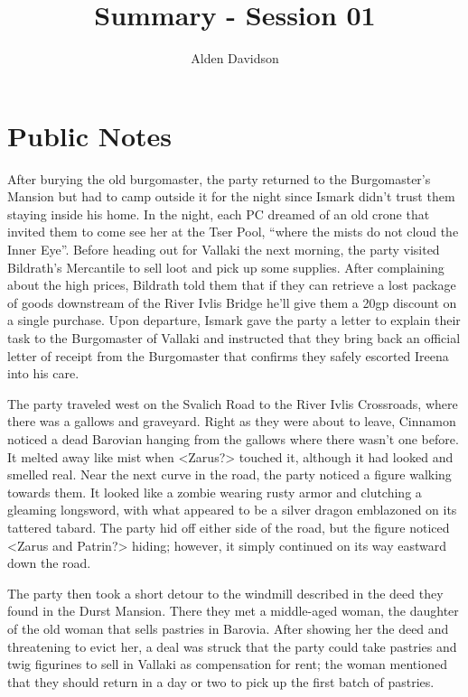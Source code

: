 \documentclass[a4paper,11pt]{article}
\title{Summary - Session 01}
\author{Alden Davidson}
\begin{document}
\maketitle


\section{Public Notes}
After burying the old burgomaster, the party returned to the Burgomaster's Mansion but had to camp outside it for
the night since Ismark didn't trust them staying inside his home. In the night, each PC dreamed of an old crone 
that invited them to come see her at the Tser Pool, ``where the mists do not cloud the Inner Eye''. Before 
heading out for Vallaki the next morning, the party visited Bildrath's Mercantile to sell loot and pick up some 
supplies. After complaining about the high prices, Bildrath told them that if they can retrieve a lost package of 
goods downstream of the River Ivlis Bridge he'll give them a 20gp discount on a single purchase. Upon departure, 
Ismark gave the party a letter to explain their task to the Burgomaster of Vallaki and instructed that they bring 
back an official letter of receipt from the Burgomaster that confirms they safely escorted Ireena into his care.

The party traveled west on the Svalich Road to the River Ivlis Crossroads, where there was a gallows and 
graveyard. Right as they were about to leave, Cinnamon noticed a dead Barovian hanging from the gallows where 
there wasn't one before. It melted away like mist when <Zarus?> touched it, although it had looked and smelled 
real. Near the next curve in the road, the party noticed a figure walking towards them. It looked like a zombie 
wearing rusty armor and clutching a gleaming longsword, with what appeared to be a silver dragon emblazoned on 
its tattered tabard. The party hid off either side of the road, but the figure noticed <Zarus and Patrin?> 
hiding; however, it simply continued on its way eastward down the road.

The party then took a short detour to the windmill described in the deed they found in the Durst Mansion. There 
they met a middle-aged woman, the daughter of the old woman that sells pastries in Barovia. After showing her the 
deed and threatening to evict her, a deal was struck that the party could take pastries and twig figurines to 
sell in Vallaki as compensation for rent; the woman mentioned that they should return in a day or two to pick up 
the first batch of pastries.
\end{document}
